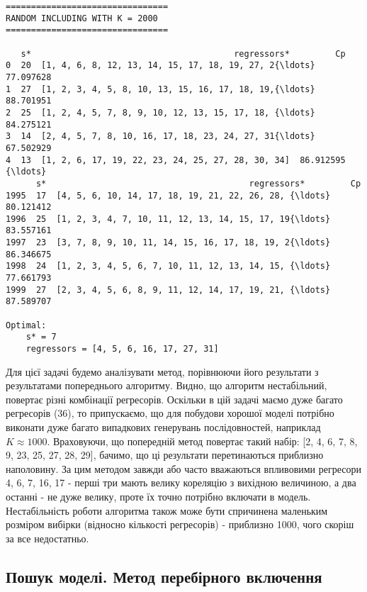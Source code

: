 \documentclass[11pt]{article}
\begin{document}
    \begin{Verbatim}[commandchars=\\\{\}]
================================
RANDOM INCLUDING WITH K = 2000
================================

   s*                                        regressors*         Cp
0  20  [1, 4, 6, 8, 12, 13, 14, 15, 17, 18, 19, 27, 2{\ldots}  77.097628
1  27  [1, 2, 3, 4, 5, 8, 10, 13, 15, 16, 17, 18, 19,{\ldots}  88.701951
2  25  [1, 2, 4, 5, 7, 8, 9, 10, 12, 13, 15, 17, 18, {\ldots}  84.275121
3  14  [2, 4, 5, 7, 8, 10, 16, 17, 18, 23, 24, 27, 31{\ldots}  67.502929
4  13  [1, 2, 6, 17, 19, 22, 23, 24, 25, 27, 28, 30, 34]  86.912595
{\ldots}
      s*                                        regressors*         Cp
1995  17  [4, 5, 6, 10, 14, 17, 18, 19, 21, 22, 26, 28, {\ldots}  80.121412
1996  25  [1, 2, 3, 4, 7, 10, 11, 12, 13, 14, 15, 17, 19{\ldots}  83.557161
1997  23  [3, 7, 8, 9, 10, 11, 14, 15, 16, 17, 18, 19, 2{\ldots}  86.346675
1998  24  [1, 2, 3, 4, 5, 6, 7, 10, 11, 12, 13, 14, 15, {\ldots}  77.661793
1999  27  [2, 3, 4, 5, 6, 8, 9, 11, 12, 14, 17, 19, 21, {\ldots}  87.589707

Optimal:
	s* = 7
	regressors = [4, 5, 6, 16, 17, 27, 31]

    \end{Verbatim}

    Для цієї задачі будемо аналізувати метод, порівнюючи його результати з
результатами попереднього алгоритму. Видно, що алгоритм нестабільний,
повертає різні комбінації регресорів. Оскільки в цій задачі маємо дуже
багато регресорів (36), то припускаємо, що для побудови хорошої моделі
потрібно виконати дуже багато випадкових генерувань послідовностей,
наприклад \(K\approx1000\). Враховуючи, що попередній метод повертає
такий набір: {[}2, 4, 6, 7, 8, 9, 23, 25, 27, 28, 29{]}, бачимо, що ці
результати перетинаються приблизно наполовину. За цим методом завжди або
часто вважаються впливовими регресори 4, 6, 7, 16, 17 - перші три мають
велику кореляцію з вихідною величиною, а два останні - не дуже велику,
проте їх точно потрібно включати в модель. Нестабільність роботи
алгоритма також може бути спричинена маленьким розміром вибірки
(відносно кількості регресорів) - приблизно 1000, чого скоріш за все
недостатньо.

    \subsection{Пошук моделі. Метод перебірного
включення}\label{ux43fux43eux448ux443ux43a-ux43cux43eux434ux435ux43bux456.-ux43cux435ux442ux43eux434-ux43fux435ux440ux435ux431ux456ux440ux43dux43eux433ux43e-ux432ux43aux43bux44eux447ux435ux43dux43dux44f}
\end{document}
